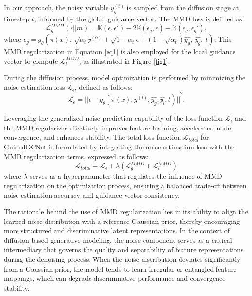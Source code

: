 \documentclass[a4paper,fleqn]{cas-sc}
\begin{document}
In our approach, the noisy variable \( y_g^{(t)} \) is sampled from the diffusion stage at timestep \( t \), informed by the global guidance vector. The MMD loss is defined as:  
\begin{equation}\label{eq1}
    \mathcal{L}^{MMD}_{g}(\epsilon||m) = \mathbb{K}(\epsilon,\epsilon')-2\mathbb{K}(\epsilon_g,\epsilon)+\mathbb{K}(\epsilon_g,\epsilon_g'),    
\end{equation}
where \(\epsilon_g = g_{\theta}\left(\pi\left(x\right),\ \sqrt{\bar{\alpha_t}} y^{(0)} + \sqrt{1 - \bar{\alpha_t}} \epsilon + \left(1 - \sqrt{\bar{\alpha_t}}\right) \hat{y_g},\ \hat{y_g},\ t\right)\). This MMD regularization in Equation \ref{eq1} is also employed for the local guidance vector to compute \( \mathcal{L}^{MMD}_{l} \), as illustrated in Figure \ref{fig1}. 

During the diffusion process, model optimization is performed by minimizing the noise estimation loss \( \mathcal{L}_{\epsilon} \), defined as follows:  
\begin{equation}
    \mathcal{L}_{\epsilon} = {||\epsilon - g_{\theta}(\pi(x), y^{(t)}, \hat{y_g}, \hat{y_l}, t)||}^2.    
\end{equation}

Leveraging the generalized noise prediction capability of the loss function \( \mathcal{L}_{\epsilon} \) and the MMD regularizer effectively improves feature learning, accelerates model convergence, and enhances stability. The total loss function \( \mathcal{L}_{total} \) for GuidedDCNet is formulated by integrating the noise estimation loss with the MMD regularization terms, expressed as follows:  
\begin{equation}
    \mathcal{L}_{total} = \mathcal{L}_{\epsilon} + \lambda (\mathcal{L}_{g}^{MMD} + \mathcal{L}_{l}^{MMD})
\end{equation}
where \( \lambda \) serves as a hyperparameter that regulates the influence of MMD regularization on the optimization process, ensuring a balanced trade-off between noise estimation accuracy and guidance vector consistency. 

The rationale behind the use of MMD regularization lies in its ability to align the learned noise distribution with a reference Gaussian prior, thereby encouraging more structured and discriminative latent representations. In the context of diffusion-based generative modeling, the noise component serves as a critical intermediary that governs the quality and separability of feature representations during the denoising process. When the noise distribution deviates significantly from a Gaussian prior, the model tends to learn irregular or entangled feature mappings, which can degrade discriminative performance and convergence stability.
\end{document}
